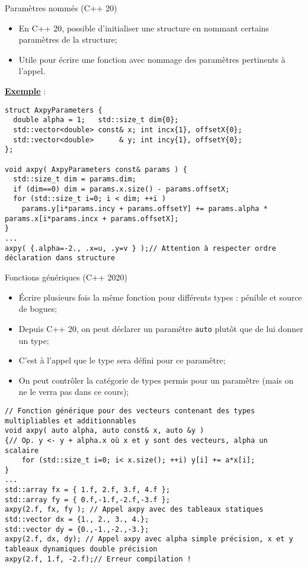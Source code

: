 \documentclass[compress,10pt,aspectratio=169]{beamer}
\begin{document}
\begin{frame}[fragile]{Paramètres nommés (C++ 20)}
  \scriptsize

\begin{itemize}
\item En C++ 20, possible d'initialiser une structure en nommant certains paramètres de la structure;
\item Utile pour écrire une fonction avec nommage des paramètres pertinents à l'appel.
\end{itemize}

\underline{\bf Exemple} :
\begin{verbatim}
struct AxpyParameters {
  double alpha = 1;   std::size_t dim{0};    
  std::vector<double> const& x; int incx{1}, offsetX{0};
  std::vector<double>      & y; int incy{1}, offsetY{0};
};
  
void axpy( AxpyParameters const& params ) {
  std::size_t dim = params.dim;
  if (dim==0) dim = params.x.size() - params.offsetX;
  for (std::size_t i=0; i < dim; ++i )
    params.y[i*params.incy + params.offsetY] += params.alpha * params.x[i*params.incx + params.offsetX];
}
... 
axpy( {.alpha=-2., .x=u, .y=v } );// Attention à respecter ordre déclaration dans structure
\end{verbatim}
\end{frame}

\begin{frame}[fragile]{Fonctions génériques (C++ 2020)}
\scriptsize

\begin{itemize}
\item \'Ecrire plusieurs fois la même fonction pour différents types : pénible et source de bogues;
\item Depuis C++ 20, on peut déclarer un paramêtre \texttt{auto} plutôt que de lui donner un type;
\item C'est à l'appel que le type sera défini pour ce paramêtre;
\item On peut contrôler la catégorie de types permis pour un paramêtre (mais on ne le verra pas dans ce cours);
\end{itemize}

\begin{verbatim}
// Fonction générique pour des vecteurs contenant des types multipliables et additionnables
void axpy( auto alpha, auto const& x, auto &y )
{// Op. y <- y + alpha.x où x et y sont des vecteurs, alpha un scalaire 
    for (std::size_t i=0; i< x.size(); ++i) y[i] += a*x[i];
}
... 
std::array fx = { 1.f, 2.f, 3.f, 4.f };
std::array fy = { 0.f,-1.f,-2.f,-3.f };
axpy(2.f, fx, fy ); // Appel axpy avec des tableaux statiques 
std::vector dx = {1., 2., 3., 4.};
std::vector dy = {0.,-1.,-2.,-3.};
axpy(2.f, dx, dy); // Appel axpy avec alpha simple précision, x et y tableaux dynamiques double précision
axpy(2.f, 1.f, -2.f);// Erreur compilation ! 
\end{verbatim}
\end{frame}
\end{document}
